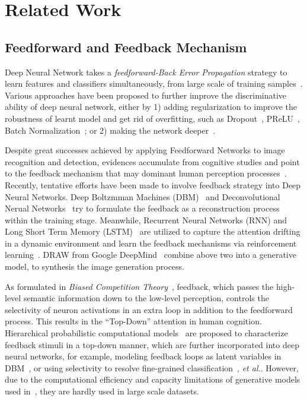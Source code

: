 \section{Related Work}
\label{sec:related_work}

\subsection{Feedforward and Feedback Mechanism}
Deep Neural Network takes a \emph{feedforward-Back Error Propagation} strategy to learn features and classifiers simultaneously, from large scale of training samples~\cite{Krizhevsky2012ImageNet,Simonyan2014Very,lin2013network,salakhutdinov2009deep,bengio2013representation}. Various approaches have been proposed to further improve the discriminative ability of deep neural network, either by 1) adding regularization to improve the robustness of learnt model and get rid of overfitting, such as Dropout~\cite{srivastava2014dropout}, PReLU~\cite{he2015delving}, Batch Normalization~\cite{ioffe2015batch}; or 2) making the network deeper~\cite{Szegedy2014Going,Simonyan2014Very}.

Despite great successes achieved by applying Feedforward Networks to image recognition and detection, evidences accumulate from cognitive studies and point to the feedback mechanism that may dominant human perception processes~\cite{Cichy2014Resolving,Rust:2010if,Kruger2013Deep,lee2003hierarchical}. Recently, tentative efforts have been made to involve feedback strategy into Deep Neural Networks. Deep Boltzmman Machines (DBM)~\cite{salakhutdinov2009deep,sohn2013learning} and Deconvolutional Nerual Networks~\cite{Zeiler:2011hy} try to formulate the feedback as a reconstruction process within the training stage. Meanwhile, Recurrent Neural Networks (RNN) and Long Short Term Memory (LSTM)~\cite{hochreiter1997long} are utilized to capture the attention drifting in a dynamic environment and learn the feedback mechanisms via reinforcement learning~\cite{Stollenga:2014tl,Mnih:2014ti}. DRAW from Google DeepMind~\cite{gregor2015draw} combine above two into a generative model, to synthesis the image generation process.

As formulated in \emph{Biased Competition Theory}~\cite{beck2009top,desimone1995neural}, feedback, which passes the high-level semantic information down to the low-level perception, controls the selectivity of neuron activations in an extra loop in addition to the feedforward process. This results in the ``Top-Down'' attention in human cognition. Hierarchical probabilistic computational models~\cite{lee2003hierarchical} are proposed to characterize feedback stimuli in a top-down manner, which are further incorporated into deep neural networks, for example, modeling feedback loops as latent variables in DBM~\cite{wang2014attentional}, or using selectivity to resolve fine-grained classification~\cite{Mnih:2014ti}, \emph{et al.}. However, due to the computational efficiency and capacity limitations of generative models used in~\cite{Mnih:2014ti,wang2014attentional}, they are hardly used in large scale datasets.

